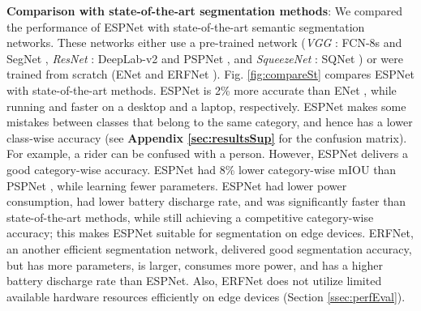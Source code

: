 \documentclass[runningheads]{llncs}
\def\Fig{Fig. }
\begin{document}
\noindent \textbf{Comparison with state-of-the-art segmentation methods}: We compared the performance of ESPNet with state-of-the-art semantic segmentation networks. These networks either use a pre-trained network (\textit{VGG} \cite{simonyan2014very}: FCN-8s \cite{long2015fully} and SegNet \cite{badrinarayanan2017segnet}, \textit{ResNet} \cite{he2016deep}: DeepLab-v2 \cite{chen2016deeplab} and PSPNet \cite{zhao2017pyramid}, and \textit{SqueezeNet} \cite{iandola2016squeezenet}: SQNet \cite{treml2016speeding}) or were trained from scratch (ENet \cite{paszke2016enet} and ERFNet \cite{romera2018erfnet}). \Fig \ref{fig:compareSt} compares ESPNet with state-of-the-art methods. ESPNet is 2\% more accurate than ENet \cite{paszke2016enet}, while running  and  faster on a desktop and a laptop, respectively. ESPNet makes some mistakes between classes that belong to the same category, and hence has a lower class-wise accuracy (see \textbf{Appendix \ref{sec:resultsSup}} for the confusion matrix). For example, a rider can be confused with a person. However, ESPNet delivers a good category-wise accuracy. ESPNet had 8\% lower category-wise mIOU than PSPNet \cite{zhao2017pyramid}, while learning  fewer parameters. ESPNet had lower power consumption, had lower battery discharge rate, and was significantly faster than state-of-the-art methods, while still achieving a competitive category-wise accuracy; this makes ESPNet suitable for segmentation on edge devices. ERFNet, an another efficient segmentation network, delivered good segmentation accuracy, but has  more parameters, is  larger, consumes more power, and has a higher battery discharge rate than ESPNet. Also, ERFNet does not utilize limited available hardware resources efficiently on edge devices (Section \ref{ssec:perfEval}).
\end{document}

